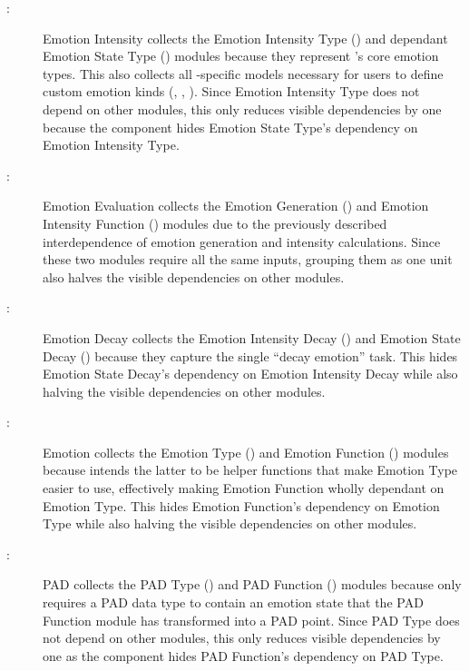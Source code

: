 \begin{description}

    \item [ \mthecpnum \label{cpIntensity}:] Emotion
    Intensity collects the Emotion Intensity Type (\textbf{})
    and dependant Emotion State Type (\textbf{}) modules
    because they represent \progname{}'s core emotion types. This also collects
    all \progname{}-specific models necessary for users to define custom
    emotion kinds (, ,
    ). Since Emotion Intensity Type does not depend
    on other modules, this only reduces visible dependencies by one because the
    component hides Emotion State Type's dependency on Emotion Intensity Type.

    \item [ \mthecpnum \label{cpGenerate}:] Emotion
    Evaluation collects the Emotion Generation (\textbf{}) and
    Emotion Intensity Function (\textbf{}) modules due to
    the previously described interdependence of emotion generation and
    intensity calculations. Since these two modules require all the same
    inputs, grouping them as one unit also halves the visible dependencies on
    other modules.

    \item [ \mthecpnum \label{cpDecay}:] Emotion Decay
    collects the Emotion Intensity Decay (\textbf{}) and Emotion
    State Decay (\textbf{}) because they capture the single
    ``decay emotion'' task. This hides Emotion State Decay's dependency on
    Emotion Intensity Decay while also halving the visible dependencies on other
    modules.

    \item [ \mthecpnum \label{cpEmotion}:] Emotion
    collects the Emotion Type (\textbf{}) and Emotion
    Function (\textbf{}) modules because \progname{} intends
    the latter to be helper functions that make Emotion Type easier to use,
    effectively making Emotion Function wholly dependant on Emotion Type. This
    hides Emotion Function's dependency on Emotion Type while also halving the
    visible dependencies on other modules.

    \item [ \mthecpnum \label{cpPAD}:] PAD collects the
    PAD Type (\textbf{}) and PAD Function
    (\textbf{}) modules because \progname{} only requires a PAD
    data type to contain an emotion state that the PAD Function module has
    transformed into a PAD point. Since PAD Type does not depend on other
    modules, this only reduces visible dependencies by one as the component
    hides PAD Function's dependency on PAD Type.


\end{description}
